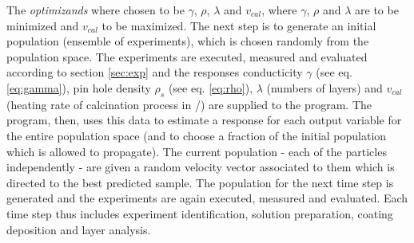 The \textit{optimizands} where chosen to be $\gamma$, $\rho$, $\lambda$ and $v_{cal}$, 
where $\gamma$, $\rho$ and $\lambda$ are to be minimized and $v_{cal}$ to be maximized.
The next step is to generate an initial population (ensemble of experiments), which is chosen randomly from the population space. 
The experiments are executed, measured and evaluated according to section 
\ref{sec:exp} and the responses conducticity $\gamma$ (see eq. \ref{eq:gamma}), pin hole density $\rho_s$ (see eq. \ref{eq:rho}), 
$\lambda$ (numbers of layers) and $v_{cal}$ (heating rate of calcination process in 
\oc{}/\minutes{}) are supplied to the program. 
The program, then, uses this data to estimate a response for each output variable 
for the entire population space
(and to choose a fraction of the initial population which is allowed to propagate).
The current population - each of the particles independently - 
are given a random velocity vector associated to them which is directed to the best predicted sample. 
The population for the next time step is generated and the experiments are again executed, measured and evaluated.
Each time step thus includes experiment identification, solution preparation, coating deposition and layer analysis. 


